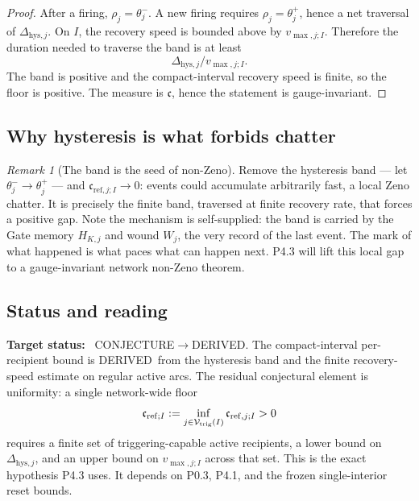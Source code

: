 \documentclass[11pt,a4paper]{article}
\newcommand{\stDerived}{\textcolor{cDer}{\textsf{\small DERIVED}}}
\newcommand{\stConj}{\textcolor{cCon}{\textsf{\small CONJECTURE}}}
\theoremstyle{definition}
\theoremstyle{plain}
\theoremstyle{remark}
\newtheorem{remark}[definition]{Remark}
\begin{document}
\begin{proof}
After a firing, \(\rho_j=\theta_j^{-}\). A new firing requires
\(\rho_j=\theta_j^{+}\), hence a net traversal of
\(\Delta_{\mathrm{hys},j}\). On \(I\), the recovery speed is bounded above by
\(v_{\max,j;I}\). Therefore the duration needed to traverse the band is at least
\[
\Delta_{\mathrm{hys},j}/v_{\max,j;I}.
\]
The band is positive and the compact-interval recovery speed is finite, so the
floor is positive. The measure is \(\mathfrak c\), hence the statement is
gauge-invariant. \qedhere
\end{proof}

\subsection{Why hysteresis is what forbids chatter}

\begin{remark}[The band is the seed of non-Zeno]\label{rem:nonzeno-seed}
Remove the hysteresis band --- let \(\theta_j^{-}\to\theta_j^{+}\) --- and
\(\mathfrak c_{\mathrm{ref},j;I}\to0\): events could accumulate arbitrarily fast, a local Zeno
chatter. It is precisely the finite band, traversed at finite recovery rate, that forces a
positive gap. Note the mechanism is self-supplied: the band is carried by the Gate memory
\(H_{K,j}\) and wound \(W_j\), the very record of the last event. The mark of what happened
is what paces what can happen next. P4.3 will lift this local gap to a gauge-invariant
network non-Zeno theorem.
\end{remark}

\subsection{Status and reading}

\textbf{Target status:}~
\stConj\(\to\)\stDerived. The compact-interval per-recipient bound is
\stDerived\ from the hysteresis band and the finite recovery-speed estimate on
regular active arcs. The residual conjectural element is uniformity: a single
network-wide floor
\[
\mathfrak c_{\mathrm{ref};I}
:=
\inf_{j\in\mathcal V_{\rm trig}(I)}
\mathfrak c_{\mathrm{ref},j;I}>0
\]
requires a finite set of triggering-capable active recipients, a lower bound on
\(\Delta_{\mathrm{hys},j}\), and an upper bound on \(v_{\max,j;I}\) across that set.
This is the exact hypothesis P4.3 uses. It depends on P0.3, P4.1, and the frozen
single-interior reset bounds.
\end{document}
